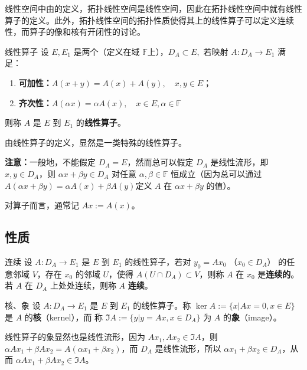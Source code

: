 
线性空间中由的定义，拓扑线性空间是线性空间，因此在拓扑线性空间中就有线性算子的定义。此外，拓扑线性空间的拓扑性质使得其上的线性算子可以定义连续性，而算子的像和核有开闭性的讨论。

\begin{definition}{线性算子}
设 $E,E_1$ 是两个（定义在域 $\mathbb F$上），$D_A\subset E,$ 若映射 $A:D_A\rightarrow E_1$ 满足：
\begin{enumerate}
\item \textbf{可加性：}$A(x+y)=A(x)+A(y),\quad x,y\in E$；
\item \textbf{齐次性：}$A(\alpha x)=\alpha A(x),\quad x\in E,\alpha\in \mathbb F$
\end{enumerate}
则称 $A$ 是 $E$ 到 $E_1$ 的\textbf{线性算子}。
  
\end{definition}

由线性算子的定义，显然是一类特殊的线性算子。

\textbf{注意：}一般地，不能假定 $D_A=E$，然而总可以假定 $D_A$ 是线性流形，即 $x,y\in D_A$，则 $\alpha x+\beta y\in D_A$ 对任意 $\alpha,\beta\in\mathbb F$ 恒成立（因为总可以通过 $A(\alpha x+\beta y)=\alpha A(x)+\beta A(y)$定义 $A$ 在 $\alpha x+\beta y$ 的值）。

对算子而言，通常记 $Ax:=A(x)$。

\subsection{性质}
\begin{definition}{连续}
设 $A:D_A\rightarrow E_1$ 是 $E$ 到 $E_1$ 的线性算子，若对 $y_0=Ax_0$ （$x_0\in D_A$） 的任意邻域 $V$，存在 $x_0$ 的邻域 $U$，使得 $A(U\cap D_A)\subset V$，则称 $A$ 在 $x_0$ 是\textbf{连续的}。若 $A$ 在 $D_A$ 上处处连续，则称 $A$ \textbf{连续}。
\end{definition}


\begin{definition}{核、象}
设 $A:D_A\rightarrow E_1$ 是 $E$ 到 $E_1$ 的线性算子。称 $\ker A:=\{x|Ax=0,x\in E\}$ 是 $A$ 的\textbf{核}（kernel），而 称 $\Im A:=\{y|y=Ax,x\in D_A\}$ 为 $A$ 的\textbf{象}（image）。 
\end{definition}

线性算子的象显然也是线性流形，因为 $Ax_1,Ax_2\in \Im A$，则 $\alpha Ax_1+\beta Ax_2=A(\alpha x_1+\beta x_2)$，而 $D_A$ 是线性流形，所以 $\alpha x_1+\beta x_2\in D_A$，从而 $\alpha Ax_1+\beta Ax_2\in\Im A$。 

